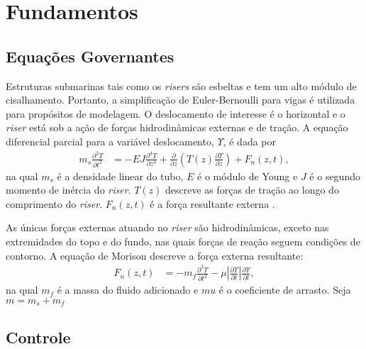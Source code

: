 \chapter{Fundamentos\label{chap:FundamentacaoMatematica}}


\section{Equações Governantes}

Estruturas submarinas tais como os \textit{risers} são esbeltas e tem um alto módulo de cisalhamento. Portanto, a simplificação de Euler-Bernoulli para vigas é utilizada para propósitos de modelagem. O deslocamento de interesse é o horizontal e o \textit{riser} está sob a ação de forças hidrodinâmicas externas e de tração. A equação diferencial parcial para a variável deslocamento, $\Upsilon$, é dada por \begin{align}
	m_s \frac{\partial^2 \Upsilon}{\partial t^2} &= -E J	\frac{\partial^4 \Upsilon}{\partial z^4} + \frac{\partial}{\partial z}\left(T(z) \frac{\partial \Upsilon}{\partial z}\right) + F_n(z,t),
\end{align} na qual $m_s$ é a densidade linear do tubo, $E$ é o módulo de Young e $J$ é o segundo momento de inércia do \textit{riser}. $T(z)$ descreve as forças de tração ao longo do comprimento do \textit{riser}. $F_n(z,t)$ é a força resultante externa \cite{fabricioIFAC}.

As únicas forças externas atuando no \textit{riser} são hidrodinâmicas, exceto nas extremidades do topo e do fundo, nas quais forças de reação seguem condições de contorno. A equação de Morison descreve a força externa resultante: \begin{align}
	F_n(z,t) &= -m_f \frac{\partial^2 \Upsilon}{\partial t^2} - \mu\left|\frac{\partial \Upsilon}{\partial t}\right|\frac{\partial \Upsilon}{\partial t},
\end{align} na qual $m_f$ é a massa do fluido adicionado e $mu$ é o coeficiente de arrasto. Seja $m = m_s + m_f$ 

\section{Controle}
